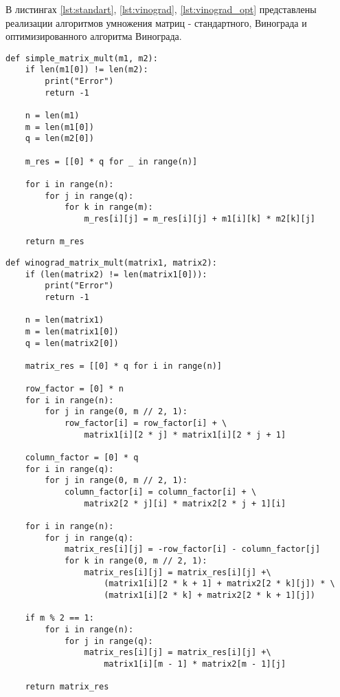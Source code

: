 В листингах \ref{lst:standart}, \ref{lst:vinograd}, \ref{lst:vinograd_opt} представлены реализации алгоритмов умножения матриц - стандартного, Винограда и оптимизированного алгоритма Винограда.


\begin{lstlisting}[label=lst:standart,caption=Реализация стандарного умножения матриц]
def simple_matrix_mult(m1, m2):
    if len(m1[0]) != len(m2):
        print("Error")
        return -1

    n = len(m1)
    m = len(m1[0])
    q = len(m2[0])

    m_res = [[0] * q for _ in range(n)]

    for i in range(n):
        for j in range(q):
            for k in range(m):
                m_res[i][j] = m_res[i][j] + m1[i][k] * m2[k][j]

    return m_res
\end{lstlisting}

\begin{lstlisting}[label=lst:vinograd,caption=Реализация алгоритма Копперсмита-Винограда]
def winograd_matrix_mult(matrix1, matrix2):
	if (len(matrix2) != len(matrix1[0])):
		print("Error")
		return -1
	
	n = len(matrix1)
	m = len(matrix1[0])
	q = len(matrix2[0])
	
	matrix_res = [[0] * q for i in range(n)]
	
	row_factor = [0] * n
	for i in range(n):
		for j in range(0, m // 2, 1):
			row_factor[i] = row_factor[i] + \
				matrix1[i][2 * j] * matrix1[i][2 * j + 1]
	
	column_factor = [0] * q
	for i in range(q):
		for j in range(0, m // 2, 1):
			column_factor[i] = column_factor[i] + \
				matrix2[2 * j][i] * matrix2[2 * j + 1][i]
	
	for i in range(n):
		for j in range(q):
			matrix_res[i][j] = -row_factor[i] - column_factor[j]
			for k in range(0, m // 2, 1):
				matrix_res[i][j] = matrix_res[i][j] +\
					(matrix1[i][2 * k + 1] + matrix2[2 * k][j]) * \
					(matrix1[i][2 * k] + matrix2[2 * k + 1][j])
	
	if m % 2 == 1:
		for i in range(n):
			for j in range(q):
				matrix_res[i][j] = matrix_res[i][j] +\
					matrix1[i][m - 1] * matrix2[m - 1][j]
	
	return matrix_res
\end{lstlisting}

